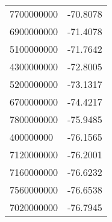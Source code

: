 \begin{tabular}{ll}
7700000000 & -70.8078 \\ 
6900000000 & -71.4078 \\ 
5100000000 & -71.7642 \\ 
4300000000 & -72.8005 \\ 
5200000000 & -73.1317 \\ 
6700000000 & -74.4217 \\ 
7800000000 & -75.9485 \\ 
400000000 & -76.1565 \\ 
7120000000 & -76.2001 \\ 
7160000000 & -76.6232 \\ 
7560000000 & -76.6538 \\ 
7020000000 & -76.7945 \\ 
\hline 
\end{tabular}